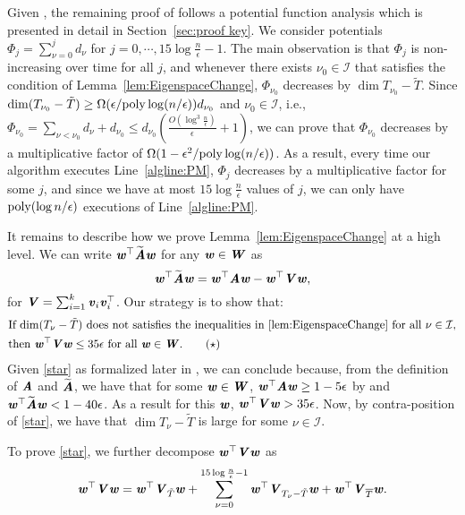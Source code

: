 Given , the remaining proof of  follows a potential function analysis which is presented in detail in Section~\ref{sec:proof key}. We consider potentials $\Phi_j = \sum_{\nu=0}^jd_{\nu}$ for $j = 0,\cdots,15\log\frac{n}{\epsilon}-1$. The main observation is that $\Phi_j$ is non-increasing over time for all $j$, and whenever there exists $\nu_0\in \mathcal{I}$ that satisfies the condition of Lemma~\ref{lem:EigenspaceChange}, $\Phi_{\nu_0}$ decreases by $\dim{T_{\nu_0}-\tilde{T}}$. Since $\dim{T_{\nu_0}-\tilde{T}} \geq \Omega(\epsilon/\poly\log(n/\epsilon))d_{\nu_0}$ and $\nu_0\in \mathcal{I}$, i.e., $\Phi_{\nu_0} = \sum_{\nu<\nu_0}d_{\nu} + d_{\nu_0} \leq d_{\nu_0} \left(\frac{O(\log^3\frac{n}{\epsilon})}{\epsilon}+1\right) $,  we can prove that $\Phi_{\nu_0}$ decreases by a multiplicative factor of $\Omega(1-\epsilon^2/\poly\log(n/\epsilon))$. As a result, every time our algorithm executes Line~\ref{algline:PM}, $\Phi_{j}$ decreases by a multiplicative factor for some $j$, and since we have at most $15\log\frac{n}{\epsilon}$ values of $j$, we can only have $\poly(\log n/\epsilon)$ executions of Line~\ref{algline:PM}.

It remains to describe how we prove Lemma~\ref{lem:EigenspaceChange} at a high level. We can write $\ww^{\top}\AAtil\ww$ for any $\ww \in \WW$ as
\[
\ww^{\top}\AAtil\ww = \ww^{\top}\AA\ww - \ww^{\top}\VV\ww,
\]
for $\VV = \sum_{i=1}^k\vv_i\vv_i^{\top}$. 
Our strategy is to show that:
\begin{align*}\label{star}
        &\text{If } \dim{T_{\nu}-\tilde{T}}\text{ does not satisfies the inequalities in \Cref{lem:EigenspaceChange} for all }\nu\in \mathcal{I},\\ 
        &\text{then }\ww^{\top}\VV\ww \leq 35\epsilon \text{ for all } \ww \in \WW. \tag{$\star$}
\end{align*}    
Given \eqref{star} as formalized later in , we can conclude  because, from the definition of $\AA$ and $\AAtil$, we have that for some $\ww\in \WW$, $\ww^{\top}\AA\ww \geq 1-5\epsilon$ by  and $\ww^{\top}\AAtil\ww <1-40\epsilon$. As a result for this $\ww$, $\ww^{\top}\VV\ww >35\epsilon$. Now, by contra-position of \eqref{star}, we have that $\dim{T_{\nu}-\tilde{T}}$ is large for some $\nu \in \mathcal{I}$.

To prove \eqref{star}, we further decompose $\ww^{\top}\VV\ww$ as
\[
\ww^{\top}\VV\ww = \ww^{\top}\VV_{\tilde{T}}\ww+\sum_{\nu = 0}^{15\log\frac{n}{\epsilon}-1}\ww^{\top}\VV_{T_{\nu} -\tilde{T}}\ww+ \ww^{\top}\VV_{\overline{T}}\ww.
\]

